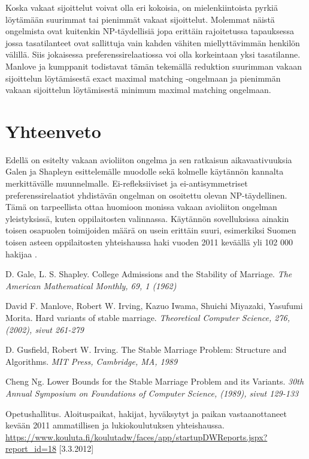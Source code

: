 \documentclass[gradu, twoside]{tktltiki}
\begin{document}
Koska vakaat sijoittelut voivat olla eri kokoisia, on mielenkiintoista
pyrkiä löytämään suurimmat tai pienimmät vakaat sijoittelut. Molemmat
näistä ongelmista ovat kuitenkin NP-täydellisiä jopa erittäin
rajoitetussa tapauksessa jossa tasatilanteet ovat sallittuja vain
kahden vähiten miellyttävimmän henkilön välillä. Siis jokaisessa
preferenssirelaatiossa voi olla korkeintaan yksi tasatilanne. Manlove
ja kumppanit todistavat tämän tekemällä reduktion suurimman vakaan
sijoittelun löytämisestä exact maximal matching -ongelmaan ja
pienimmän vakaan sijoittelun löytämisestä minimum maximal matching
ongelmaan. \cite{manlove02}

\section{Yhteenveto}

Edellä on esitelty vakaan avioliiton ongelma ja sen ratkaisun
aikavaativuuksia Galen ja Shapleyn esittelemälle muodolle sekä
kolmelle käytännön kannalta merkittävälle muunnelmalle.
Ei-refleksiiviset ja ei-antisymmetriset preferenssirelaatiot
yhdistävän ongelman on osoitettu olevan NP-täydellinen. Tämä on
tarpeellista ottaa huomioon monissa vakaan avioliiton ongelman
yleistyksissä, kuten oppilaitosten valinnassa. Käytännön sovelluksissa
ainakin toisen osapuolen toimijoiden määrä on usein erittäin suuri,
esimerkiksi Suomen toisen asteen oppilaitosten yhteishaussa haki
vuoden 2011 keväällä yli 102 000 hakijaa \cite{OPH12}.

\begin{thebibliography}{XXX99}

  D. Gale, L. S. Shapley.
  College Admissions and the Stability of Marriage.
  \emph{The American Mathematical Monthly, 69, 1 (1962)}

  David F. Manlove, Robert W. Irving, Kazuo Iwama, Shuichi Miyazaki,
  Yasufumi Morita.
  Hard variants of stable marriage.
  \emph{Theoretical Computer Science, 276, (2002), sivut 261-279}

  D. Gusfield, Robert W. Irving.
  The Stable Marriage Problem: Structure and Algorithms.
  \emph{MIT Press, Cambridge, MA, 1989}

  Cheng Ng.
  Lower Bounds for the Stable Marriage Problem and its Variants.
  \emph{30th Annual Symposium on Foundations of Computer Science,
    (1989), sivut 129-133}

  Opetushallitus.
  Aloituspaikat, hakijat, hyväksytyt ja paikan vastaanottaneet
  kevään 2011 ammatillisen ja lukiokoulutuksen yhteishaussa.
  \url{https://www.kouluta.fi/koulutadw/faces/app/startupDWReports.jspx?report_id=18}
      [3.3.2012]

\end{thebibliography}
\end{document}
